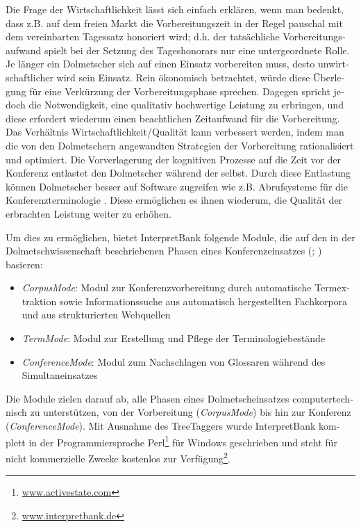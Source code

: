 \documentclass[output=paper]{LSP/langsci}
\begin{document}
\begin{otherlanguage}{ngerman}
Die Frage der Wirtschaftlichkeit lässt sich einfach erklären, wenn man bedenkt, dass z.B. auf dem freien Markt die Vorbereitungszeit in der Regel pauschal mit dem vereinbarten Tagessatz honoriert wird; d.h. der tatsächliche Vorbereitungsaufwand spielt bei der Setzung des Tageshonorars nur eine untergeordnete Rolle. Je länger ein Dolmetscher sich auf einen Einsatz vorbereiten muss, desto unwirtschaftlicher wird sein Einsatz. Rein ökonomisch betrachtet, würde diese Überlegung für eine Verkürzung der Vorbereitungsphase sprechen. Dagegen spricht jedoch die Notwendigkeit, eine qualitativ hochwertige Leistung zu erbringen, und diese erfordert wiederum einen beachtlichen Zeitaufwand für die Vorbereitung. Das Verhältnis Wirtschaftlichkeit/Qualität kann verbessert werden, indem man die von den Dolmetschern angewandten Strategien der Vorbereitung rationalisiert und optimiert. Die Vorverlagerung der kognitiven Prozesse auf die Zeit vor der Konferenz entlastet den Dolmetscher während der  selbst. Durch diese Entlastung können Dolmetscher besser auf Software zugreifen wie z.B. Abrufsysteme für die Konferenzterminologie \citep{Stoll2002}. Diese ermöglichen es ihnen wiederum, die Qualität der erbrachten Leistung weiter zu erhöhen.

Um dies zu ermöglichen, bietet InterpretBank folgende Module, die auf den in der Dolmetschwissenschaft beschriebenen Phasen eines Konferenzeinsatzes (\citealt[778]{Kalina2005}; \citealt[52ff]{Will2009}) basieren:

\begin{itemize}
\item 
\textit{CorpusMode}: Modul zur Konferenzvorbereitung durch automatische Term\-extraktion sowie Informationssuche aus automatisch hergestellten Fachkorpora und aus strukturierten Webquellen 
\item 
\textit{TermMode}: Modul zur Erstellung und Pflege der Terminologiebestände
\item 
\textit{ConferenceMode}: Modul zum Nachschlagen von Glossaren während des Simultaneinsatzes
\end{itemize}

Die Module zielen darauf ab, alle Phasen eines Dolmetscheinsatzes computertechnisch zu unterstützen, von der Vorbereitung (\textit{CorpusMode}) bis hin zur Konferenz (\textit{ConferenceMode}). Mit Ausnahme des TreeTaggers wurde InterpretBank komplett in der Programmiersprache Perl\footnote{\url{www.activestate.com}} für Windows geschrieben und steht für nicht kommerzielle Zwecke kostenlos zur Verfügung\footnote{\url{ www.interpretbank.de}}.


\end{otherlanguage}
\end{document}
